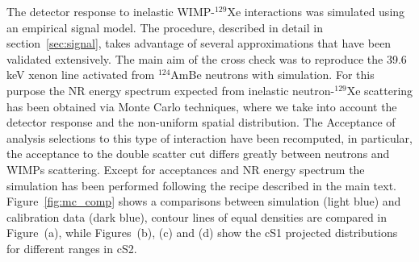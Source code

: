 The detector response to inelastic WIMP-$^{129}$Xe interactions was simulated using an empirical signal model. 
The procedure, described in detail in section~\ref{sec:signal}, takes advantage of several 
approximations that have been validated extensively. 
The main aim of the cross check was to reproduce the 39.6\,keV xenon line activated from $^{124}$AmBe neutrons with simulation.
For this purpose the NR energy spectrum expected from inelastic neutron-$^{129}$Xe scattering has been obtained via  Monte Carlo techniques, 
where we take into account the  detector response and the non-uniform spatial distribution. The Acceptance of analysis selections to this type of interaction 
have been recomputed, in particular, the acceptance to the double scatter cut differs greatly between neutrons and WIMPs scattering. 
Except for acceptances and NR energy spectrum the simulation has been performed following the recipe described in the main text. Figure~\ref{fig:mc_comp}
shows a comparisons between simulation (light blue) and calibration data (dark blue), contour lines of equal densities are compared in Figure~(a), 
while Figures~(b), (c) and (d) show the cS1 projected distributions for different ranges in cS2.



